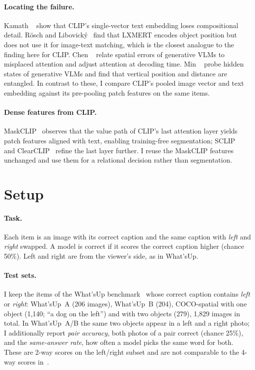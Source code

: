 \documentclass[10pt,twocolumn,letterpaper]{article}
\begin{document}
\paragraph{Locating the failure.}
Kamath \etal~\cite{kamath2023bottleneck} show that CLIP's single-vector text embedding loses compositional detail.
Rösch and Libovický~\cite{rosch2022probing} find that LXMERT encodes object position but does not use it for image-text matching, which is the closest analogue to the finding here for CLIP.
Chen \etal~\cite{chen2025adaptvis} relate spatial errors of generative VLMs to misplaced attention and adjust attention at decoding time.
Min \etal~\cite{min2026farlooksup} probe hidden states of generative VLMs and find that vertical position and distance are entangled.
In contrast to these, I compare CLIP's pooled image vector and text embedding against its pre-pooling patch features on the same items.

\paragraph{Dense features from CLIP.}
MaskCLIP~\cite{zhou2022maskclip} observes that the value path of CLIP's last attention layer yields patch features aligned with text, enabling training-free segmentation; SCLIP~\cite{wang2024sclip} and ClearCLIP~\cite{lan2024clearclip} refine the last layer further.
I reuse the MaskCLIP features unchanged and use them for a relational decision rather than segmentation.

\section{Setup}
\label{sec:setup}

\paragraph{Task.}
Each item is an image with its correct caption and the same caption with \emph{left} and \emph{right} swapped.
A model is correct if it scores the correct caption higher (chance 50\%).
Left and right are from the viewer's side, as in What'sUp.

\paragraph{Test sets.}
I keep the items of the What'sUp benchmark~\cite{kamath2023whatsup} whose correct caption contains \emph{left} or \emph{right}: What'sUp~A (206 images), What'sUp~B (204), COCO-spatial with one object (1{,}140; \eg ``a dog on the left'') and with two objects (279), 1{,}829 images in total.
In What'sUp~A/B the same two objects appear in a left and a right photo; I additionally report \emph{pair accuracy}, \ie both photos of a pair correct (chance 25\%), and the \emph{same-answer rate}, \ie how often a model picks the same word for both.
These are 2-way scores on the left/right subset and are not comparable to the 4-way scores in~\cite{kamath2023whatsup}.
\end{document}
